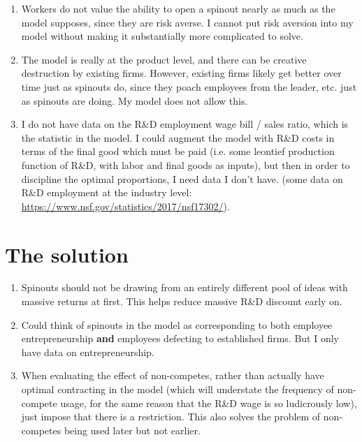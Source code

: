 \documentclass[12pt,english]{article}
\theoremstyle{remark}
\begin{document}
\begin{enumerate}
	\item Workers do not value the ability to open a spinout nearly as much as the model supposes, since they are risk averse. I cannot put risk aversion into my model without making it substantially more complicated to solve. 
	\item The model is really at the product level, and there can be creative destruction by existing firms. However, existing firms likely get better over time just as spinouts do, since they poach employees from the leader, etc. just as spinouts are doing. My model does not allow this. 
	\item I do not have data on the R\&D employment wage bill / sales ratio, which is the statistic in the model. I could augment the model with R\&D costs in terms of the final good which must be paid (i.e. some leontief production function of R\&D, with labor and final goods as inputs), but then in order to discipline the optimal proportions, I need data I don't have. (some data on R\&D employment at the industry level:  \href{https://www.nsf.gov/statistics/2017/nsf17302/}{https://www.nsf.gov/statistics/2017/nsf17302/}).
\end{enumerate}


\section{The solution}

\begin{enumerate}
	\item Spinouts should not be drawing from an entirely different pool of ideas with massive returns at first. This helps reduce massive R\&D discount early on.
	\item Could think of spinouts in the model as corresponding to both employee entrepreneurship \textbf{and} employees defecting to established firms. But I only have data on entrepreneurship. 
	\item When evaluating the effect of non-competes, rather than actually have optimal contracting in the model (which will understate the frequency of non-compete usage, for the same reason that the R\&D wage is so ludicrously low), just impose that there is a restriction. This also solves the problem of non-competes being used later but not earlier.
\end{enumerate}
\end{document}
